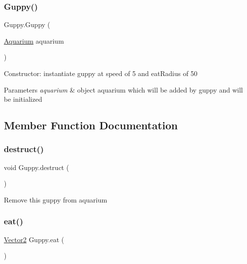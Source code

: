 \subsubsection{\texorpdfstring{Guppy()}{Guppy()}}
{\footnotesize\ttfamily Guppy.\+Guppy (\begin{DoxyParamCaption}\item[{\mbox{\hyperlink{class_aquarium}{Aquarium}}}]{aquarium }\end{DoxyParamCaption})\hspace{0.3cm}{\ttfamily [inline]}}

Constructor\+: instantiate guppy at speed of 5 and eat\+Radius of 50 
\begin{DoxyParams}{Parameters}
{\em aquarium} & object aquarium which will be added by guppy and will be initialized \\
\hline
\end{DoxyParams}


\subsection{Member Function Documentation}
\mbox{\label{class_guppy_a023ab91782b173342f367b318f642761}} 
\subsubsection{\texorpdfstring{destruct()}{destruct()}}
{\footnotesize\ttfamily void Guppy.\+destruct (\begin{DoxyParamCaption}{ }\end{DoxyParamCaption})\hspace{0.3cm}{\ttfamily [inline]}}

Remove this guppy from aquarium \mbox{\label{class_guppy_a3fdade6bb3cb79b691b5948e522aea8f}} 
\subsubsection{\texorpdfstring{eat()}{eat()}}
{\footnotesize\ttfamily \mbox{\hyperlink{class_vector2}{Vector2}} Guppy.\+eat (\begin{DoxyParamCaption}{ }\end{DoxyParamCaption})\hspace{0.3cm}{\ttfamily [inline]}}

